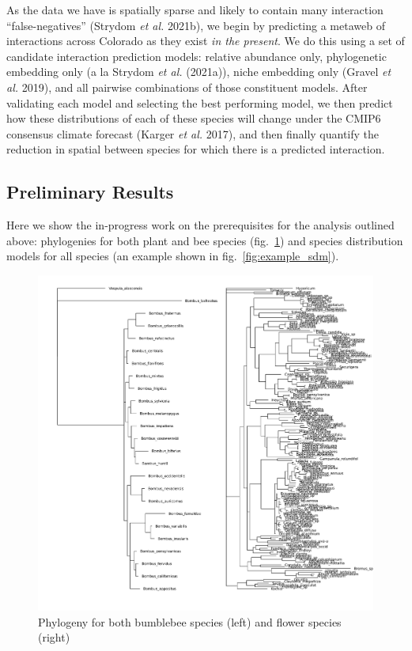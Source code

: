 \documentclass[10pt,oneside]{article}
\makeatletter
\def\maxwidth{\ifdim\Gin@nat@width>\linewidth\linewidth
\else\Gin@nat@width\fi}
\let\Oldincludegraphics\includegraphics
\renewcommand{\includegraphics}[1]{\Oldincludegraphics[width=\maxwidth]{#1}}
\makeatother
\begin{document}
As the data we have is spatially sparse and likely to contain many
interaction ``false-negatives'' (Strydom \emph{et al.} 2021b), we begin
by predicting a metaweb of interactions across Colorado as they exist
\emph{in the present}. We do this using a set of candidate interaction
prediction models: relative abundance only, phylogenetic embedding only
(a la Strydom \emph{et al.} (2021a)), niche embedding only (Gravel
\emph{et al.} 2019), and all pairwise combinations of those constituent
models. After validating each model and selecting the best performing
model, we then predict how these distributions of each of these species
will change under the CMIP6 consensus climate forecast (Karger \emph{et
al.} 2017), and then finally quantify the reduction in spatial between
species for which there is a predicted interaction.

\hypertarget{preliminary-results}{%
\subsection{Preliminary Results}\label{preliminary-results}}

Here we show the in-progress work on the prerequisites for the analysis
outlined above: phylogenies for both plant and bee species
(fig.~\ref{fig:phylo}) and species distribution models for all species
(an example shown in fig.~\ref{fig:example_sdm}).

\begin{figure}
\hypertarget{fig:phylo}{%
\centering
\includegraphics{./figures/trees.png}
\caption{Phylogeny for both bumblebee species (left) and flower species
(right)}\label{fig:phylo}
}
\end{figure}
\end{document}
